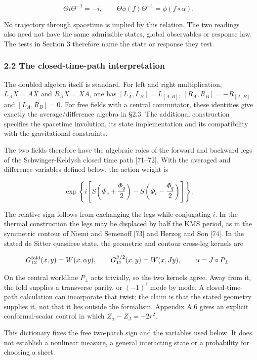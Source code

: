 \documentclass[
]{article}
\begin{document}
\[
\Theta i\Theta^{-1}=-i,
\qquad
\Theta\phi(f)\Theta^{-1}=\phi(f\circ\alpha).
\]

No trajectory through spacetime is implied by this relation. The two
readings also need not have the same admissible states, global
observables or response law. The tests in Section 3 therefore name the
state or response they test.

\subsubsection{2.2 The closed-time-path
interpretation}\label{the-closed-time-path-interpretation}

The doubled algebra itself is standard. For left and right
multiplication, \(L_A X=AX\) and \(R_A X=XA\), one has
\([L_A,L_B]=L_{[A,B]}\), \([R_A,R_B]=-R_{[A,B]}\) and \([L_A,R_B]=0\).
For free fields with a central commutator, these identities give exactly
the average/difference algebra in §2.3. The additional construction
specifies the spacetime involution, its state implementation and its
compatibility with the gravitational constraints.

The two fields therefore have the algebraic roles of the forward and
backward legs of the Schwinger-Keldysh closed time path {[}71--72{]}.
With the averaged and difference variables defined below, the action
weight is

\[
\exp\!\left\{i\left[
S\!\left(\Phi_c+\frac{\Phi_q}{2}\right)
-S\!\left(\Phi_c-\frac{\Phi_q}{2}\right)
\right]\right\}.
\]

The relative sign follows from exchanging the legs while conjugating
\(i\). In the thermal construction the legs may be displaced by half the
KMS period, as in the symmetric contour of Niemi and Semenoff {[}73{]}
and Herzog and Son {[}74{]}. In the stated de Sitter quasifree state,
the geometric and contour cross-leg kernels are

\[
G_{12}^{\rm fold}(x,y)=W(x,\alpha y),\qquad
G_{12}^{\beta/2}(x,y)=W(x,Jy),\qquad
\alpha=J\circ P_\perp.
\]

On the central worldline \(P_\perp\) acts trivially, so the two kernels
agree. Away from it, the fold supplies a transverse parity, or
\((-1)^\ell\) mode by mode. A closed-time-path calculation can
incorporate that twist; the claim is that the stated geometry supplies
it, not that it lies outside the formalism. Appendix A.6 gives an
explicit conformal-scalar control in which \(Z_\alpha-Z_J=-2r^2\).

This dictionary fixes the free two-patch sign and the variables used
below. It does not establish a nonlinear measure, a general interacting
state or a probability for choosing a sheet.
\end{document}
